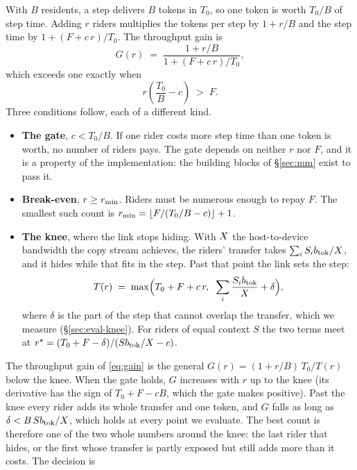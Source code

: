 With $B$ residents, a step delivers $B$ tokens in $T_0$, so one token is worth
$T_0/B$ of step time. Adding $r$ riders multiplies the tokens per step by
$1+r/B$ and the step time by $1+(F+c\,r)/T_0$. The throughput gain is
\begin{equation}
  G(r) \;=\; \frac{1 + r/B}{1 + (F + c\,r)/T_0},
  \label{eq:gain}
\end{equation}
which exceeds one exactly when
\begin{equation}
  r\left(\frac{T_0}{B}-c\right) \;>\; F .
  \label{eq:pays}
\end{equation}
Three conditions follow, each of a different kind.
\begin{itemize}\itemsep1pt
\item \textbf{The gate}, $c < T_0/B$. If one rider costs more step time than
  one token is worth, no number of riders pays. The gate depends on neither $r$
  nor $F$, and it is a property of the implementation: the building blocks of
  \S\ref{sec:mm} exist to pass it.
\item \textbf{Break-even}, $r \ge r_{\min}$. Riders must be numerous enough to
  repay $F$. The smallest such count is
  $r_{\min} = \lfloor F/(T_0/B - c)\rfloor + 1$.
\item \textbf{The knee}, where the link stops hiding. With $X$ the
  host-to-device bandwidth the copy stream achieves, the riders' transfer
  takes $\sum_i S_ib_{\mathrm{tok}}/X$, and it hides while that fits in the step.
  Past that point the link sets the step:
  \begin{equation}
    T(r) \;=\; \max\Bigl(T_0 + F + c\,r,\;\; \sum_i \frac{S_ib_{\mathrm{tok}}}{X} + \delta\Bigr),
    \label{eq:step}
  \end{equation}
  where $\delta$ is the part of the step that cannot overlap the transfer, which
  we measure (\S\ref{sec:eval-knee}). For riders of equal context $S$ the two
  terms meet at
  $r^{\star} = (T_0 + F - \delta)/(Sb_{\mathrm{tok}}/X - c)$.
\end{itemize}
The throughput gain of \cref{eq:gain} is the general
$G(r) = (1+r/B)\,T_0/T(r)$ below the knee. When the gate holds, $G$ increases
with $r$ up to the knee (its derivative has the sign of $T_0 + F - cB$, which
the gate makes positive). Past the knee every rider adds its whole transfer and
one token, and $G$ falls as long as $\delta < B\,Sb_{\mathrm{tok}}/X$, which holds
at every point we evaluate. The best count is therefore one of the two whole
numbers around the knee: the last rider that hides, or the first whose
transfer is partly exposed but still adds more than it costs. The decision is
